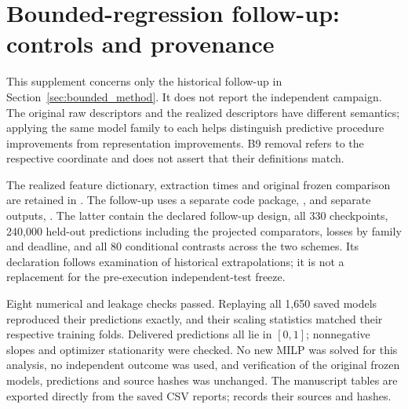 \section{Bounded-regression follow-up: controls and provenance}
\label{app:bounded_followup}
This supplement concerns only the historical follow-up in
Section~\ref{sec:bounded_method}. It does not report the independent campaign.
The original raw descriptors and the realized descriptors have different
semantics; applying the same model family to each helps distinguish predictive
procedure improvements from representation improvements. B9 removal refers
to the respective coordinate and does not assert that their definitions match.





The realized feature dictionary, extraction times and original frozen
comparison are retained in
.
The follow-up uses a separate code package,
, and separate outputs,
.
The latter contain the declared follow-up design, all 330 checkpoints,
240,000 held-out predictions including the projected comparators, losses by
family and deadline, and all 80 conditional contrasts across the two schemes.
Its declaration follows examination of historical extrapolations; it is not
a replacement for the pre-execution independent-test freeze.

Eight numerical and leakage checks passed. Replaying all 1,650 saved models
reproduced their predictions exactly, and their scaling statistics matched
their respective training folds. Delivered predictions all lie in $[0,1]$;
nonnegative slopes and optimizer stationarity were checked. No new MILP was
solved for this analysis, no independent outcome was used, and verification
of the original frozen models, predictions and source hashes was unchanged.
The manuscript tables are exported directly from the saved CSV reports;
 records their sources
and hashes.
